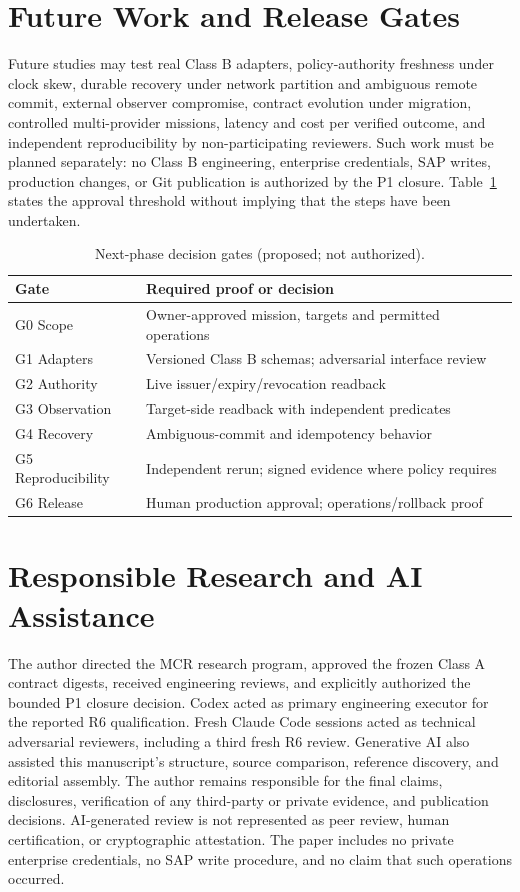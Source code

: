 \documentclass[11pt,twocolumn]{article}
\begin{document}
\section{Future Work and Release Gates}
Future studies may test real Class B adapters, policy-authority freshness under clock skew, durable recovery under network partition and ambiguous remote commit, external observer compromise, contract evolution under migration, controlled multi-provider missions, latency and cost per verified outcome, and independent reproducibility by non-participating reviewers. Such work must be planned separately: no Class B engineering, enterprise credentials, SAP writes, production changes, or Git publication is authorized by the P1 closure. Table~\ref{tab:future} states the approval threshold without implying that the steps have been undertaken.

\begin{table}[t]
\centering\caption{Next-phase decision gates (proposed; not authorized).}
\label{tab:future}
\footnotesize
\begin{tabularx}{\columnwidth}{@{}p{}X@{}}
\toprule
\textbf{Gate} & \textbf{Required proof or decision}\\\midrule
G0 Scope & Owner-approved mission, targets and permitted operations\\
G1 Adapters & Versioned Class B schemas; adversarial interface review\\
G2 Authority & Live issuer/expiry/revocation readback\\
G3 Observation & Target-side readback with independent predicates\\
G4 Recovery & Ambiguous-commit and idempotency behavior\\
G5 Reproducibility & Independent rerun; signed evidence where policy requires\\
G6 Release & Human production approval; operations/rollback proof\\\bottomrule
\end{tabularx}
\end{table}

\section{Responsible Research and AI Assistance}
The author directed the MCR research program, approved the frozen Class A contract digests, received engineering reviews, and explicitly authorized the bounded P1 closure decision. Codex acted as primary engineering executor for the reported R6 qualification. Fresh Claude Code sessions acted as technical adversarial reviewers, including a third fresh R6 review. Generative AI also assisted this manuscript's structure, source comparison, reference discovery, and editorial assembly. The author remains responsible for the final claims, disclosures, verification of any third-party or private evidence, and publication decisions. AI-generated review is not represented as peer review, human certification, or cryptographic attestation. The paper includes no private enterprise credentials, no SAP write procedure, and no claim that such operations occurred.
\end{document}
